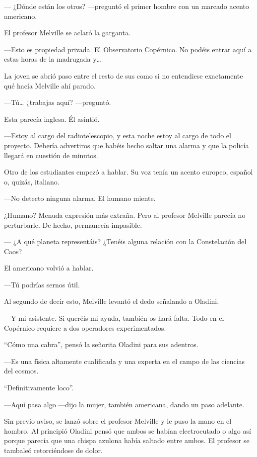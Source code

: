 --- ¿Dónde están los otros? ---preguntó el primer hombre con un marcado
acento americano.

El profesor Melville se aclaró la garganta.

---Esto es propiedad privada. El Observatorio Copérnico. No podéis
entrar aquí   a estas horas de la madrugada y\ldots{}

La joven se abrió paso entre el resto de sus como si no entendiese
exactamente qué hacía Melville ahí parado.

---Tú\ldots{} ¿trabajas aquí? ---preguntó.

Esta parecía inglesa. Él asintió.

---Estoy al cargo del radiotelescopio, y esta noche estoy al cargo de
todo el proyecto. Debería advertiros que habéis hecho saltar una alarma
y que la policía llegará en cuestión de minutos.

Otro de los estudiantes empezó a hablar. Su voz tenía un acento europeo,
español o, quizás, italiano.

---No detecto ninguna alarma. El humano miente.

¿Humano? Menuda expresión más extraña. Pero al profesor Melville
parecía no perturbarle. De hecho, permanecía impasible.

--- ¿A qué planeta representáis? ¿Tenéis alguna relación con la
Constelación del Caos?

El americano volvió a hablar.

---Tú podrías sernos útil.

Al segundo de decir esto, Melville levantó el dedo señalando a Oladini.

---Y mi asistente. Si queréis mi ayuda, también os hará falta. Todo en
el Copérnico requiere a dos operadores experimentados.

``Cómo una cabra'', pensó la señorita Oladini para sus adentros.

---Es una física altamente cualificada y una experta en el campo de las
ciencias del cosmos.

``Definitivamente loco''.

---Aquí pasa algo ---dijo la mujer, también americana, dando un paso
adelante.

Sin previo aviso, se lanzó sobre el profesor Melville y le puso la mano
en el hombro. Al principió Oladini pensó que ambos se habían
electrocutado o algo así porque parecía que una chispa azulona había
saltado entre ambos. El profesor se tambaleó retorciéndose de dolor.

